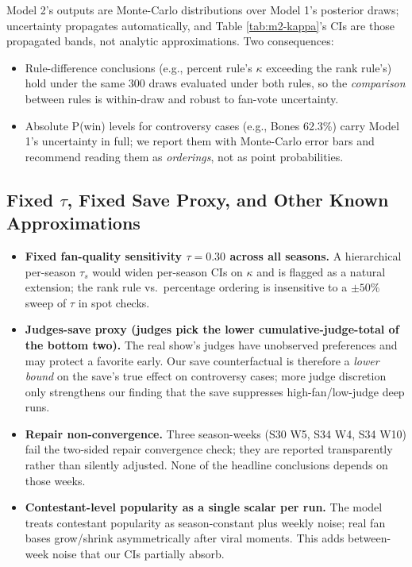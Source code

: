 \documentclass{article}
\begin{document}
Model 2's outputs are Monte-Carlo distributions over Model 1's posterior draws; uncertainty propagates automatically, and Table \ref{tab:m2-kappa}'s CIs are those propagated bands, not analytic approximations. Two consequences:
\begin{itemize}
  \item Rule-difference conclusions (e.g., percent rule's $\kappa$ exceeding the rank rule's) hold under the same 300 draws evaluated under both rules, so the \emph{comparison} between rules is within-draw and robust to fan-vote uncertainty.
  \item Absolute P(win) levels for controversy cases (e.g., Bones 62.3\%) carry Model 1's uncertainty in full; we report them with Monte-Carlo error bars and recommend reading them as \emph{orderings}, not as point probabilities.
\end{itemize}

\subsection{Fixed $\tau$, Fixed Save Proxy, and Other Known Approximations}

\begin{itemize}
  \item \textbf{Fixed fan-quality sensitivity $\tau = 0.30$ across all seasons.} A hierarchical per-season $\tau_s$ would widen per-season CIs on $\kappa$ and is flagged as a natural extension; the rank rule vs.\ percentage ordering is insensitive to a $\pm 50\%$ sweep of $\tau$ in spot checks.
  \item \textbf{Judges-save proxy (judges pick the lower cumulative-judge-total of the bottom two).} The real show's judges have unobserved preferences and may protect a favorite early. Our save counterfactual is therefore a \emph{lower bound} on the save's true effect on controversy cases; more judge discretion only strengthens our finding that the save suppresses high-fan/low-judge deep runs.
  \item \textbf{Repair non-convergence.} Three season-weeks (S30 W5, S34 W4, S34 W10) fail the two-sided repair convergence check; they are reported transparently rather than silently adjusted. None of the headline conclusions depends on those weeks.
  \item \textbf{Contestant-level popularity as a single scalar per run.} The model treats contestant popularity as season-constant plus weekly noise; real fan bases grow/shrink asymmetrically after viral moments. This adds between-week noise that our CIs partially absorb.
\end{itemize}
\end{document}
